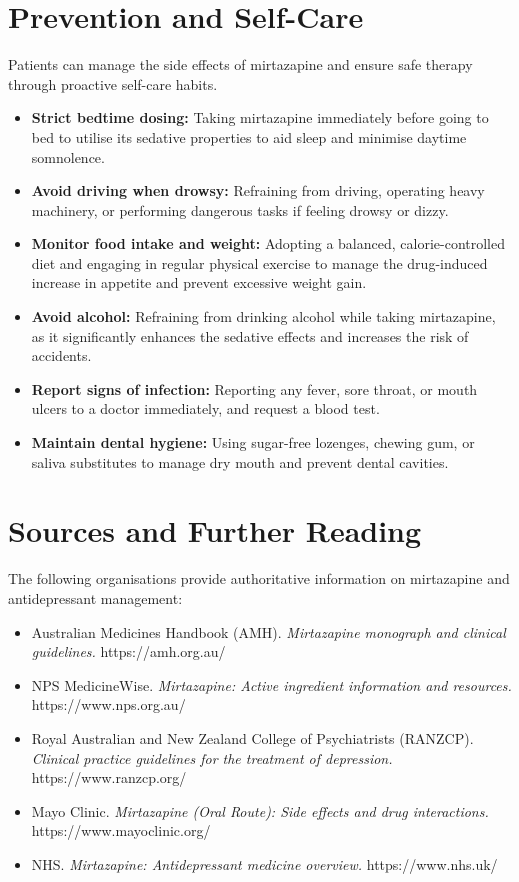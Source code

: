 \section*{Prevention and Self-Care}
Patients can manage the side effects of mirtazapine and ensure safe therapy through proactive self-care habits.
\begin{itemize}
    \item \textbf{Strict bedtime dosing:} Taking mirtazapine immediately before going to bed to utilise its sedative properties to aid sleep and minimise daytime somnolence.
    \item \textbf{Avoid driving when drowsy:} Refraining from driving, operating heavy machinery, or performing dangerous tasks if feeling drowsy or dizzy.
    \item \textbf{Monitor food intake and weight:} Adopting a balanced, calorie-controlled diet and engaging in regular physical exercise to manage the drug-induced increase in appetite and prevent excessive weight gain.
    \item \textbf{Avoid alcohol:} Refraining from drinking alcohol while taking mirtazapine, as it significantly enhances the sedative effects and increases the risk of accidents.
    \item \textbf{Report signs of infection:} Reporting any fever, sore throat, or mouth ulcers to a doctor immediately, and request a blood test.
    \item \textbf{Maintain dental hygiene:} Using sugar-free lozenges, chewing gum, or saliva substitutes to manage dry mouth and prevent dental cavities.
\end{itemize}

\section*{Sources and Further Reading}
The following organisations provide authoritative information on mirtazapine and antidepressant management:
\begin{itemize}
    \item Australian Medicines Handbook (AMH). \textit{Mirtazapine monograph and clinical guidelines.} https://amh.org.au/
    \item NPS MedicineWise. \textit{Mirtazapine: Active ingredient information and resources.} https://www.nps.org.au/
    \item Royal Australian and New Zealand College of Psychiatrists (RANZCP). \textit{Clinical practice guidelines for the treatment of depression.} https://www.ranzcp.org/
    \item Mayo Clinic. \textit{Mirtazapine (Oral Route): Side effects and drug interactions.} https://www.mayoclinic.org/
    \item NHS. \textit{Mirtazapine: Antidepressant medicine overview.} https://www.nhs.uk/
\end{itemize}
